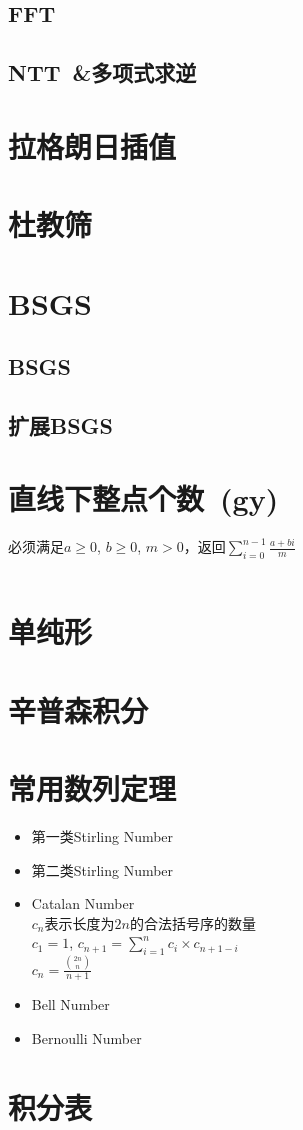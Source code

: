 \subsection{FFT}
\subsection{NTT\ \&多项式求逆}
\section{拉格朗日插值}
\section{杜教筛}
\section{BSGS}
\subsection{BSGS}
\subsection{扩展BSGS}
\section{直线下整点个数\ \small(gy)}
必须满足$ a \geq 0 $, $ b \geq 0 $, $ m > 0 $，返回$ \sum\limits_{i=0}^{n-1} \frac{a + bi}{m} $
\inputminted{cpp}{Math/points_below_line.cpp}
\section{单纯形}
\section{辛普森积分}
\section{常用数列定理}
\begin{itemize}
	\item 第一类Stirling Number
	\item 第二类Stirling Number
	\item Catalan Number\\$ c_n $表示长度为$ 2n $的合法括号序的数量\\$ c_1 = 1 $, $ c_{n+1} = \sum\limits_{i=1}^{n} c_i \times c_{n + 1 - i} $\\$ c_n = \frac{\binom{2n}{n}}{n + 1} $
	\item Bell Number
	\item Bernoulli Number
\end{itemize}
\section{积分表}